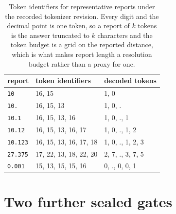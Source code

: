 \documentclass{article}
\theoremstyle{definition}
\theoremstyle{remark}
\newif\ifcornerstone
\begin{document}
\begin{table}[h]
\centering
\small
\caption{Token identifiers for representative reports under the recorded tokenizer revision.
Every digit and the decimal point is one token, so a report of $k$ tokens is the answer truncated to $k$ characters and the token budget is a grid on the reported distance, which is what makes report length a resolution budget rather than a proxy for one.}
\label{tab:tokens}
\begin{tabular}{lll}
\toprule
report & token identifiers & decoded tokens \\
\midrule
\texttt{10} & 16, 15 & 1, 0 \\
\texttt{10.} & 16, 15, 13 & 1, 0, . \\
\texttt{10.1} & 16, 15, 13, 16 & 1, 0, ., 1 \\
\texttt{10.12} & 16, 15, 13, 16, 17 & 1, 0, ., 1, 2 \\
\texttt{10.123} & 16, 15, 13, 16, 17, 18 & 1, 0, ., 1, 2, 3 \\
\texttt{27.375} & 17, 22, 13, 18, 22, 20 & 2, 7, ., 3, 7, 5 \\
\texttt{0.001} & 15, 13, 15, 15, 16 & 0, ., 0, 0, 1 \\
\bottomrule
\end{tabular}
\end{table}

\ifcornerstone
\section{Two further sealed gates}
\label{app:gates}
\end{document}
